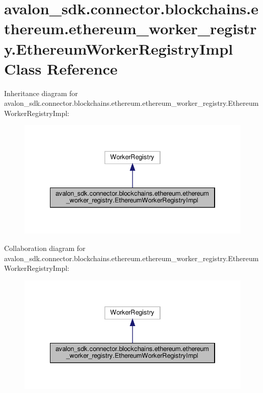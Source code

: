 \hypertarget{classavalon__sdk_1_1connector_1_1blockchains_1_1ethereum_1_1ethereum__worker__registry_1_1EthereumWorkerRegistryImpl}{}\section{avalon\+\_\+sdk.\+connector.\+blockchains.\+ethereum.\+ethereum\+\_\+worker\+\_\+registry.\+Ethereum\+Worker\+Registry\+Impl Class Reference}
\label{classavalon__sdk_1_1connector_1_1blockchains_1_1ethereum_1_1ethereum__worker__registry_1_1EthereumWorkerRegistryImpl}


Inheritance diagram for avalon\+\_\+sdk.\+connector.\+blockchains.\+ethereum.\+ethereum\+\_\+worker\+\_\+registry.\+Ethereum\+Worker\+Registry\+Impl\+:
\nopagebreak
\begin{figure}[H]
\begin{center}
\leavevmode
\includegraphics[width=334pt]{classavalon__sdk_1_1connector_1_1blockchains_1_1ethereum_1_1ethereum__worker__registry_1_1Ethere4f82d622da85f612c335f45b9dd4e959}
\end{center}
\end{figure}


Collaboration diagram for avalon\+\_\+sdk.\+connector.\+blockchains.\+ethereum.\+ethereum\+\_\+worker\+\_\+registry.\+Ethereum\+Worker\+Registry\+Impl\+:
\nopagebreak
\begin{figure}[H]
\begin{center}
\leavevmode
\includegraphics[width=334pt]{classavalon__sdk_1_1connector_1_1blockchains_1_1ethereum_1_1ethereum__worker__registry_1_1Ethere270aad7ca887854585e488c849900cc6}
\end{center}
\end{figure}
